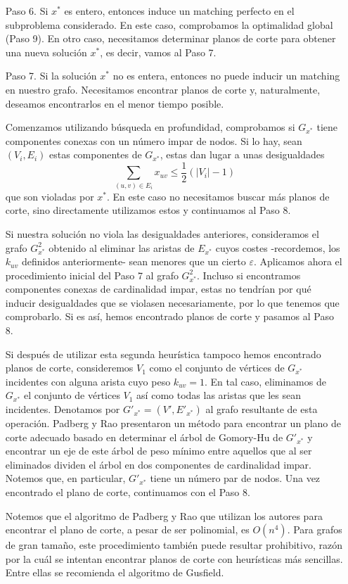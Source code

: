 \documentclass[twoside,a4paper,openright,12pt]{book}
\begin{document}
\begin{itemize}
\item[Paso 6.] Si $x^*$ es entero, entonces induce un matching perfecto en el subproblema considerado. En este caso, comprobamos la optimalidad global (Paso 9). En otro caso, necesitamos determinar planos de corte para obtener una nueva solución $x^*$, es decir, vamos al Paso 7.
\item[Paso 7.] Si la solución $x^*$ no es entera, entonces no puede inducir un matching en nuestro grafo. Necesitamos encontrar planos de corte y, naturalmente, deseamos encontrarlos en el menor tiempo posible.

Comenzamos utilizando búsqueda en profundidad, comprobamos si $G_{x^*}$ tiene componentes conexas con un número impar de nodos. Si lo hay, sean $(V_i,E_i)$ estas componentes de $G_{x^*}$, estas dan lugar a unas desigualdades
$$
\sum_{(u,v)\in E_i} x_{uv} \leq \frac{1}{2}(|V_i|-1)
$$ 
que son violadas por $x^*$. En este caso no necesitamos buscar más planos de corte, sino directamente utilizamos estos y continuamos al Paso 8.

Si nuestra solución no viola las desigualdades anteriores, consideramos el grafo $G^2_{x^*}$ obtenido al eliminar las aristas de $E_{x^*}$ cuyos costes -recordemos, los $k_{uv}$ definidos anteriormente- sean menores que un cierto $\varepsilon$. Aplicamos ahora el procedimiento inicial del Paso 7 al grafo $G^2_{x^*}$. Incluso si encontramos componentes conexas de cardinalidad impar, estas no tendrían por qué inducir desigualdades que se violasen necesariamente, por lo que tenemos que comprobarlo. Si es así, hemos encontrado planos de corte y pasamos al Paso 8. 

Si después de utilizar esta segunda heurística tampoco hemos encontrado planos de corte, consideremos $V_1$ como el conjunto de vértices de $G_{x^*}$ incidentes con alguna arista cuyo peso $k_{uv}=1$. En tal caso, eliminamos de $G_{x^*}$ el conjunto de vértices $V_1$ así como todas las aristas que les sean incidentes. Denotamos por $G'_{x^*} =(V',E'_{x^*})$ al grafo resultante de esta operación. Padberg y Rao presentaron un método para encontrar un plano de corte adecuado \cite{rao} basado en determinar el árbol de Gomory-Hu de $G'_{x^*}$ y encontrar un eje de este árbol de peso mínimo entre aquellos que al ser eliminados dividen el árbol en dos componentes de cardinalidad impar. Notemos que, en particular, $G'_{x^*}$ tiene un número par de nodos.
Una vez encontrado el plano de corte, continuamos con el Paso 8.

Notemos que el algoritmo de Padberg y Rao que utilizan los autores para encontrar el plano de corte, a pesar de ser polinomial, es $O(n^4)$. Para grafos de gran tamaño, este procedimiento también puede resultar prohibitivo, razón por la cuál se intentan encontrar planos de corte con heurísticas más sencillas. Entre ellas se recomienda el algoritmo de Gusfield.


\end{itemize}
\end{document}
